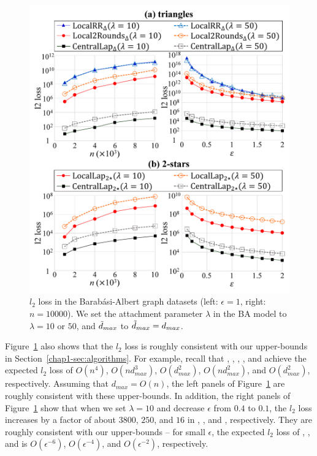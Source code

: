 \begin{figure}[t]
\centering
\includegraphics[width=0.99\linewidth]{fig/res6_BAGraph.pdf}
\vspace{-2mm}
\caption{$l_2$ loss in the Barab\'{a}si-Albert graph datasets 
(left: $\epsilon=1$, right: $n=10000$). 
We set the attachment parameter $\lambda$ in the BA model to $\lambda=10$ or $50$, and $\tilde{d}_{max}$ to $\tilde{d}_{max} = d_{max}$.}
\label{chap1-fig:res6_BAGraph}
\end{figure}

Figure~\ref{chap1-fig:res6_BAGraph} also shows that the $l_2$ loss is roughly consistent with our upper-bounds in Section~\ref{chap1-sec:algorithms}. 
For example, recall that , , , , and  achieve the expected $l_2$ loss of $O(n^4)$, $O(nd_{max}^3)$, $O(d_{max}^2)$, $O(nd_{max}^{2})$, and $O(d_{max}^{2})$, respectively. 
Assuming that $d_{max} = O(n)$, the left panels of Figure~\ref{chap1-fig:res6_BAGraph} are roughly consistent with these upper-bounds. 
In addition, the right panels of Figure~\ref{chap1-fig:res6_BAGraph} show that when we set $\lambda=10$ and decrease $\epsilon$ from $0.4$ to $0.1$, the $l_2$ loss increases by a factor of about $3800$, $250$, and $16$ in , , and , respectively. 
They are roughly consistent with our upper-bounds -- for small $\epsilon$, the expected $l_2$ loss of , , and  is  $O(\epsilon^{-6})$, $O(\epsilon^{-4})$, and $O(\epsilon^{-2})$, respectively.

